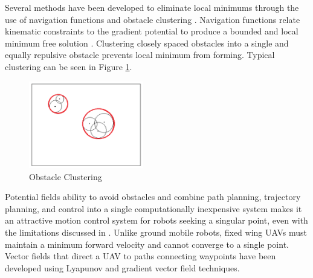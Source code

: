 \documentclass[numbered,pdftex]{ohio-etd}
\begin{document}
Several methods have been developed to eliminate local minimums through the use of navigation functions \cite{goerzen_survey_2010} and obstacle clustering \cite{liu_virtual-waypoint_2016}. Navigation functions relate kinematic constraints to the gradient potential to produce a bounded and local minimum free solution \cite{rimon_exact_1992}. Clustering closely spaced obstacles into a single and equally repulsive obstacle prevents local minimum from forming. Typical clustering can be seen in Figure \ref{fig:obstacleclustering}. 

\begin{figure}[H]
	\centering
	\includegraphics[width=5cm]{PaperFigures/obstacleClustering}
	\caption{Obstacle Clustering \cite{liu_virtual-waypoint_2016}}
	\label{fig:obstacleclustering}
\end{figure}

Potential fields ability to avoid obstacles and combine path planning, trajectory planning, and control into a single computationally inexpensive system makes it an attractive motion control system for robots seeking a singular point, even with the limitations discussed in \cite{koren_potential_1991}. Unlike ground mobile robots, fixed wing UAVs must maintain a minimum forward velocity and cannot converge to a single point. Vector fields that direct a UAV to paths connecting waypoints have been developed using Lyapunov and gradient vector field techniques. 
 
 
\end{document}
